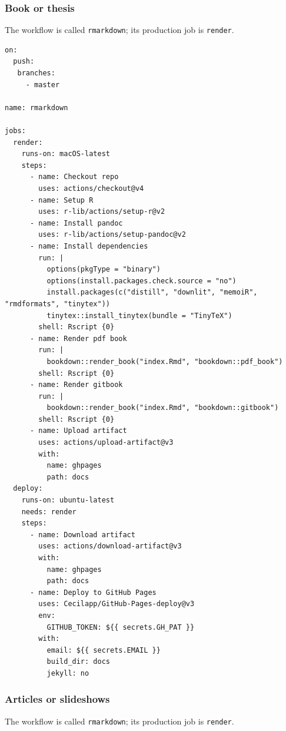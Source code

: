 \documentclass[
  12pt,
  american,
  a4paper,
  extrafontsizes,onecolumn,openright
  ]{memoir}
\begin{document}
\hypertarget{sec:bookdown-ci}{%
\subsubsection{Book or thesis}\label{sec:bookdown-ci}}

The workflow is called \texttt{rmarkdown}; its production job is \texttt{render}.

\begin{verbatim}
on:
  push:
   branches:
     - master

name: rmarkdown

jobs:
  render:
    runs-on: macOS-latest
    steps:
      - name: Checkout repo
        uses: actions/checkout@v4
      - name: Setup R
        uses: r-lib/actions/setup-r@v2
      - name: Install pandoc
        uses: r-lib/actions/setup-pandoc@v2
      - name: Install dependencies
        run: |
          options(pkgType = "binary")
          options(install.packages.check.source = "no")
          install.packages(c("distill", "downlit", "memoiR", "rmdformats", "tinytex"))
          tinytex::install_tinytex(bundle = "TinyTeX")
        shell: Rscript {0}
      - name: Render pdf book
        run: |
          bookdown::render_book("index.Rmd", "bookdown::pdf_book")
        shell: Rscript {0}
      - name: Render gitbook
        run: |
          bookdown::render_book("index.Rmd", "bookdown::gitbook")
        shell: Rscript {0}
      - name: Upload artifact
        uses: actions/upload-artifact@v3
        with:
          name: ghpages
          path: docs
  deploy:
    runs-on: ubuntu-latest
    needs: render
    steps:
      - name: Download artifact
        uses: actions/download-artifact@v3
        with:
          name: ghpages
          path: docs
      - name: Deploy to GitHub Pages
        uses: Cecilapp/GitHub-Pages-deploy@v3
        env:
          GITHUB_TOKEN: ${{ secrets.GH_PAT }}
        with:
          email: ${{ secrets.EMAIL }}
          build_dir: docs
          jekyll: no
\end{verbatim}

\hypertarget{articles-or-slideshows}{%
\subsubsection{Articles or slideshows}\label{articles-or-slideshows}}

The workflow is called \texttt{rmarkdown}; its production job is \texttt{render}.
\end{document}
